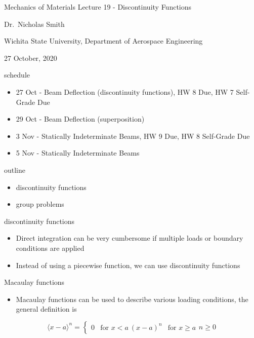 \documentclass[
  letterpaper,
  ignorenonframetext,
  aspectratio=43,
  handout,
  12pt]{beamer}
\author{}
\date{}
\providecommand{\tightlist}{%
  \setlength{\itemsep}{0pt}\setlength{\parskip}{0pt}}
\providecommand{\tightlist}{%
\setlength{\itemsep}{0pt}\setlength{\parskip}{0pt}}
\begin{document}
\begin{frame}{Mechanics of Materials}
\protect\hypertarget{mechanics-of-materials}{}
Lecture 19 - Discontinuity Functions

Dr.~Nicholas Smith

Wichita State University, Department of Aerospace Engineering

27 October, 2020
\end{frame}

\begin{frame}{schedule}
\protect\hypertarget{schedule}{}
\begin{itemize}
\tightlist
\item
  27 Oct - Beam Deflection (discontinuity functions), HW 8 Due, HW 7
  Self-Grade Due
\item
  29 Oct - Beam Deflection (superposition)
\item
  3 Nov - Statically Indeterminate Beams, HW 9 Due, HW 8 Self-Grade Due
\item
  5 Nov - Statically Indeterminate Beams
\end{itemize}
\end{frame}

\begin{frame}{outline}
\protect\hypertarget{outline}{}
\begin{itemize}
\tightlist
\item
  discontinuity functions
\item
  group problems
\end{itemize}
\end{frame}

\begin{frame}{discontinuity functions}
\protect\hypertarget{discontinuity-functions}{}
\begin{itemize}
\tightlist
\item
  Direct integration can be very cumbersome if multiple loads or
  boundary conditions are applied
\item
  Instead of using a piecewise function, we can use discontinuity
  functions
\end{itemize}
\end{frame}

\begin{frame}{Macaulay functions}
\protect\hypertarget{macaulay-functions}{}
\begin{itemize}
\tightlist
\item
  Macaulay functions can be used to describe various loading conditions,
  the general definition is
\end{itemize}

\[\langle x-a\rangle^n = \begin{cases}
  0 & \text{for } x < a\
  (x-a)^n & \text{for } x \ge a
\end{cases}
n \ge 0\]
\end{frame}
\end{document}
